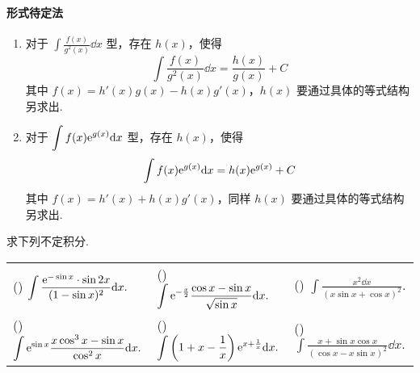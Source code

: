 \paragraph{形式待定法}
\begin{enumerate}[label=(\arabic{*})]
    \item 对于 $\displaystyle\int\frac{f(x)}{g^2(x)}\dd x$ 型，存在 $h(x)$，使得 $$\displaystyle\int\frac{f(x)}{g^2(x)}\dd x=\frac{h(x)}{g(x)}+C$$
          其中 $f(x)=h'(x)g(x)-h(x)g'(x)$，$h(x)$ 要通过具体的等式结构另求出.
    \item 对于 $\displaystyle\int f(x)\mathrm{e} ^{g(x)}\dd x$ 型，存在 $h(x)$，使得 $$\displaystyle\int f(x)\mathrm{e} ^{g(x)}\dd x=h(x)\mathrm{e} ^{g(x)}+C$$
          其中 $f(x)=h'(x)+h(x)g'(x)$，同样 $h(x)$ 要通过具体的等式结构另求出.
\end{enumerate}

\begin{example}
    求下列不定积分.
    \setcounter{magicrownumbers}{0}
    \begin{table}[H]
        \centering
        \begin{tabular}{l | l | l}
            (\rownumber{}) $\displaystyle\int\frac{\mathrm{e} ^{-\sin x}\cdot\sin 2x}{(1-\sin x)^2}\dd x.$ & (\rownumber{}) $\displaystyle\int\mathrm{e} ^{-\frac{x}{2}}\frac{\cos x-\sin x}{\sqrt{\sin x}}\dd x.$ & (\rownumber{}) $\displaystyle\int\frac{x^2\dd x}{(x\sin x+\cos x)^2}.$            \\
            (\rownumber{}) $\displaystyle\int\mathrm{e} ^{\sin x}\frac{x\cos^3x-\sin x}{\cos^2x}\dd x.$    & (\rownumber{}) $\displaystyle\int\left(1+x-\dfrac{1}{x}\right)\mathrm{e} ^{x+\frac{1}{x}}\dd x.$      & (\rownumber{}) $\displaystyle\int\frac{x+\sin x\cos x}{(\cos x-x\sin x)^2}\dd x.$
        \end{tabular}
    \end{table}
\end{example}

